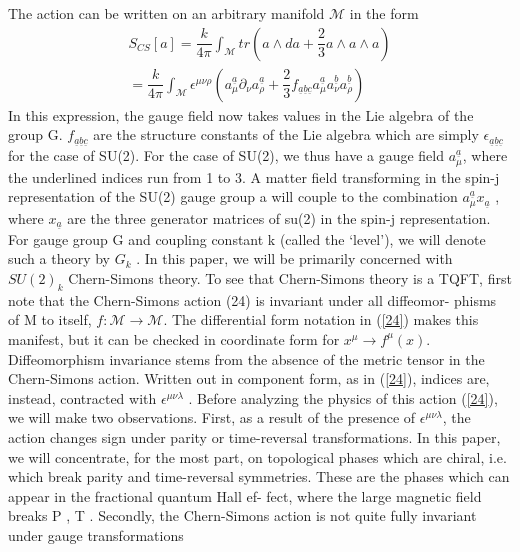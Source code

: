 The action can be written on an arbitrary manifold $\mathcal{M}$ in the
form 
\begin{eqnarray}\label{24}
S_{CS}[a] = \dfrac{k}{4\pi} \int_{\mathcal{M}} tr\left(a \wedge da +\dfrac{2}{3} a\wedge a \wedge a\right)
\\ = \dfrac{k}{4\pi} \int_{\mathcal{M}} \epsilon^{\mu \nu \rho}
\left(a^{\underline{a}}_{\mu}\partial_{\nu} a^{\underline{a}}_{\rho}
+\dfrac{2}{3} f_{\underline{a}\underline{b}\underline{c}}a^{\underline{a}}_{\mu}a^{\underline{b}}_{\nu}a^{\underline{b}}_{\rho} \right)
\end{eqnarray}
In this expression, the gauge field now takes values in the Lie algebra
of the group G. $f_{\underline{a}\underline{b}\underline{c}}$ are the
structure constants of the Lie algebra which are simply $\epsilon_{\underline{a}\underline{b}\underline{c}}$ for the case of SU(2). 
For the case of SU(2), we thus have a gauge field $a^{\underline{a}}_{\mu}$, where the underlined indices run from 1 to 3. A matter field transforming in the spin-j representation of the SU(2) gauge group
a will couple to the combination $a^{\underline{a}}_{\mu} x_{\underline{a}}$ , where $x_{\underline{a}}$ are the three
generator matrices of su(2) in the spin-j representation. For
gauge group G and coupling constant k (called the ‘level’),
we will denote such a theory by $G_k$ . In this paper, we will be
primarily concerned with $SU(2)_{k}$ Chern-Simons theory.
To see that Chern-Simons theory is a TQFT, first note that
the Chern-Simons action (24) is invariant under all diffeomor-
phisms of M to itself, $f : \mathcal{M} \rightarrow \mathcal{M}$. The differential form
notation in (\ref{24}) makes this manifest, but it can be checked
in coordinate form for $x^{\mu}\rightarrow f ^{\mu} (x)$. Diffeomorphism invariance stems from the absence of the metric tensor in the
Chern-Simons action. Written out in component form, as in
(\ref{24}), indices are, instead, contracted with $\epsilon^{\mu \nu \lambda}$ .
Before analyzing the physics of this action (\ref{24}), we will
make two observations. First, as a result of the presence 
of $\epsilon^{\mu \nu \lambda}$, the action changes sign under parity or time-reversal transformations.
In this paper, we will concentrate, for the 
most part, on topological phases which are chiral, i.e. which 
break parity and time-reversal symmetries. These are the 
phases which can appear in the fractional quantum Hall ef- 
fect, where the large magnetic field breaks P , T . 
Secondly, the Chern-Simons action is not quite fully invariant under gauge transformations
